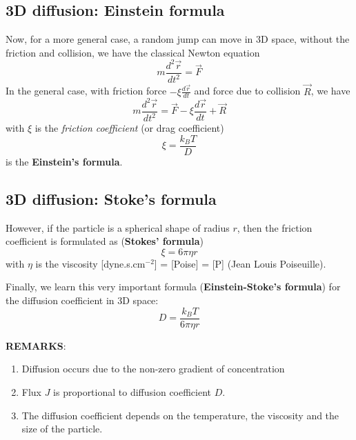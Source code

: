 \subsection{3D diffusion: Einstein formula}
\label{sec:3d-diffusion}

Now, for a more general case, a random jump can
move in 3D space, without the friction and collision, we have the
classical Newton equation
\begin{equation}
  m \frac{d^2\overrightarrow r}{dt^2} = \overrightarrow F
\end{equation}
In the general case, with friction force $-\xi \frac{d\overrightarrow
  r}{dt}$ and force due to collision $\overrightarrow R$, we have
\begin{equation}
  m \frac{d^2\overrightarrow r}{dt^2} =\overrightarrow F - \xi
          \frac{d\overrightarrow r}{dt} + \overrightarrow{R} 
\end{equation}
with $\xi$ is the {\it friction coefficient} (or drag coefficient)
\begin{equation}
  \xi = \frac{k_BT}{D}
\end{equation}
is the {\bf Einstein's formula}. 

\subsection{3D diffusion: Stoke's formula}

However, if the particle is a spherical shape of radius $r$, then the friction
coefficient is formulated as ({\bf Stokes' formula})
\begin{equation}
  \xi = 6\pi\eta r
\end{equation}
with $\eta$ is the viscosity [dyne.s.cm$^{-2}$] = [Poise] = [P] (Jean
Louis Poiseuille).

Finally, we learn this very important formula
({\bf Einstein-Stoke's formula}) for the diffusion coefficient in 3D
space:
\begin{equation}
  D = \frac{k_B T}{6\pi \eta r}
\end{equation}

{\bf REMARKS}:
\begin{enumerate}
\item Diffusion occurs due to the non-zero gradient of concentration

\item Flux $J$ is proportional to diffusion coefficient $D$.

\item The diffusion coefficient depends on the temperature, the
  viscosity and the size of the particle.
\end{enumerate}


